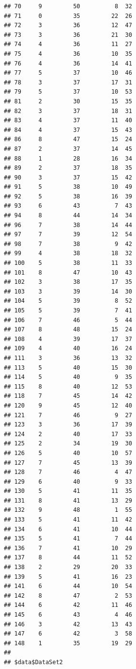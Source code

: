 \documentclass[
]{book}
\begin{document}
\begin{verbatim}
## 70     9         50          8  32
## 71     0         35         22  26
## 72     3         36         12  47
## 73     3         36         21  30
## 74     4         36         11  27
## 75     4         36         10  35
## 76     4         36         14  41
## 77     5         37         10  46
## 78     3         37         17  31
## 79     5         37         10  53
## 81     2         30         15  35
## 82     3         37         18  31
## 83     4         37         11  40
## 84     4         37         15  43
## 86     8         47         15  24
## 87     2         37         14  45
## 88     1         28         16  34
## 89     2         37         18  35
## 90     3         37         15  42
## 91     5         38         10  49
## 92     5         38         16  39
## 93     6         43          7  43
## 94     8         44         14  34
## 96     7         38         14  44
## 97     7         39         12  54
## 98     7         38          9  42
## 99     4         38         18  32
## 100    5         38         11  33
## 101    8         47         10  43
## 102    3         38         17  35
## 103    3         39         14  30
## 104    5         39          8  52
## 105    5         39          7  41
## 106    7         46          5  44
## 107    8         48         15  24
## 108    4         39         17  37
## 109    4         40         16  24
## 111    3         36         13  32
## 113    5         40         15  30
## 114    5         40          9  35
## 115    8         40         12  53
## 118    7         45         14  42
## 120    9         45         12  40
## 121    7         46          9  27
## 123    3         36         17  39
## 124    2         40         17  33
## 125    2         34         19  30
## 126    5         40         10  57
## 127    7         45         13  39
## 128    7         46          4  47
## 129    6         40          9  33
## 130    5         41         11  35
## 131    8         41         13  29
## 132    9         48          1  55
## 133    5         41         11  42
## 134    6         41         10  44
## 135    5         41          7  44
## 136    7         41         10  29
## 137    8         44         11  52
## 138    2         29         20  33
## 139    5         41         16  23
## 141    6         44         10  54
## 142    8         47          2  53
## 144    6         42         11  46
## 145    6         43          4  46
## 146    3         42         13  43
## 147    6         42          3  58
## 148    1         35         19  29
## 
## $data$DataSet2

\end{verbatim}
\end{document}

